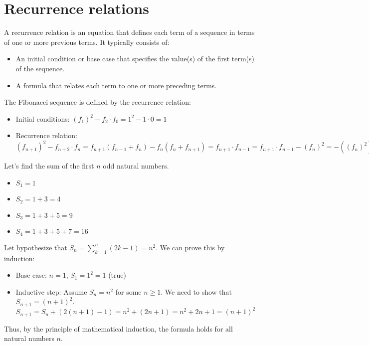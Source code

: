 \section{Recurrence relations}
\begin{definition}
    A recurrence relation is an equation that defines each term of a sequence in terms of one or more previous terms. It typically consists of:
    \begin{itemize}[itemsep=1pt,label=$\circ$]
        \item An initial condition or base case that specifies the value(s) of the first term(s) of the sequence.
        \item A formula that relates each term to one or more preceding terms.
    \end{itemize}
\end{definition}
\begin{eg}
    The Fibonacci sequence is defined by the recurrence relation:
    \begin{itemize}[itemsep=1pt,label=$\circ$]
        \item Initial conditions: $(f_1)^2 - f_2 \cdot f_0 = 1^2 - 1 \cdot 0 = 1$
        \item Recurrence relation: $(f_{n + 1})^2 - f_{n + 2} \cdot f_n = f_{n+1}(f_{n -1} + f_n) - f_n (f_n + f_{n + 1}) = f_{n + 1} \cdot f_{n -1} = f_{n + 1} \cdot f_{n - 1} - (f_n)^2 = -((f_n)^2)$
    \end{itemize}
\end{eg}

\begin{eg}
    Let's find the sum of the first $n$ odd natural numbers.
    \begin{itemize}[itemsep=1pt,label=$\circ$]
        \item $S_1 = 1$
        \item $S_2 = 1 + 3 = 4$
        \item $S_3 = 1 + 3 + 5 = 9$
        \item $S_4 = 1 + 3 + 5 + 7 = 16$
    \end{itemize}
    Let hypothesize that $S_n = \sum_{k = 1}^{n} (2k -1) = n^2$. We can prove this by induction:
    \begin{itemize}[itemsep=1pt,label=$\circ$]
        \item Base case: $n = 1$, $S_1 = 1^2 = 1$ (true)
        \item Inductive step: Assume $S_n = n^2$ for some $n \geq 1$. We need to show that $S_{n + 1} = (n + 1)^2$.
        \[
        S_{n + 1} = S_n + (2(n + 1) - 1) = n^2 + (2n + 1) = n^2 + 2n + 1 = (n + 1)^2
        \]
    \end{itemize}
    Thus, by the principle of mathematical induction, the formula holds for all natural numbers \( n \).
\end{eg}

